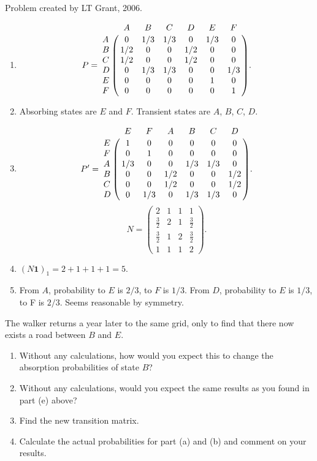 \documentclass[12pt]{article}
\begin{document}
\begin{solution}
    Problem created by LT Grant, 2006.
    \begin{enumerate}[label=(\alph*)]
    \item
        \[
            P = \bordermatrix{ & A & B & C & D & E & F \cr
            A & 0 & 1/3 & 1/3 & 0 & 1/3 & 0 \cr
            B & 1/2 & 0 & 0 & 1/2 & 0 & 0 \cr
            C & 1/2 & 0 & 0 & 1/2 & 0 & 0 \cr
            D & 0 & 1/3 & 1/3 & 0 & 0 & 1/3 \cr
            E & 0 & 0 & 0 & 0 & 1 & 0 \cr
            F & 0 & 0 & 0 & 0 & 0 & 1 }.
        \]
    \item
        Absorbing states are \( E \) and \( F \). Transient states are \(
        A \), \( B \), \( C \), \( D \).
    \item
        \[
            P' = \bordermatrix{ & E & F & A & B & C & D \cr
            E & 1 & 0 & 0 & 0 & 0 & 0 \cr
            F & 0 & 1 & 0 & 0 & 0 & 0 \cr
            A & 1/3 & 0 & 0 & 1/3 & 1/3 & 0 \cr
            B & 0 & 0 & 1/2 & 0 & 0 & 1/2 \cr
            C & 0 & 0 & 1/2 & 0 & 0 & 1/2 \cr
            D & 0 & 1/3 & 0 & 1/3 & 1/3 & 0 \cr
            }.
        \]
        \[
            N =
            \begin{pmatrix}
                2 & 1 & 1 & 1\\
                \frac{3}{2} & 2 & 1 & \frac{3}{2}\\
                \frac{3}{2} & 1 & 2 & \frac{3}{2}\\
                1 & 1 & 1 & 2
            \end{pmatrix}
            .
        \]
    \item
        \( (N \mathbf{1})_{1} = 2 + 1 + 1 + 1 = 5 \).
    \item
        From \( A \), probability to \( E \) is \( 2/3 \), to \( F \) is
        \( 1/3 \). From \( D \), probability to \( E \) is \( 1/3 \), to
        F is \( 2/3 \). Seems reasonable by symmetry.
\end{enumerate}
\end{solution}
\begin{exercise}
    The walker returns a year later to the same grid, only to find that
    there now exists a road between \( B \) and \( E \).
    \begin{enumerate}[label=(\alph*)]
    \item
        Without any calculations, how would you expect this to change
        the absorption probabilities of state \( B \)?
    \item
        Without any calculations, would you expect the same results as
        you found in part (e) above?
    \item
        Find the new transition matrix.
    \item
        Calculate the actual probabilities for part (a) and (b) and
        comment on your results.
\end{enumerate}
\end{exercise}
\end{document}
